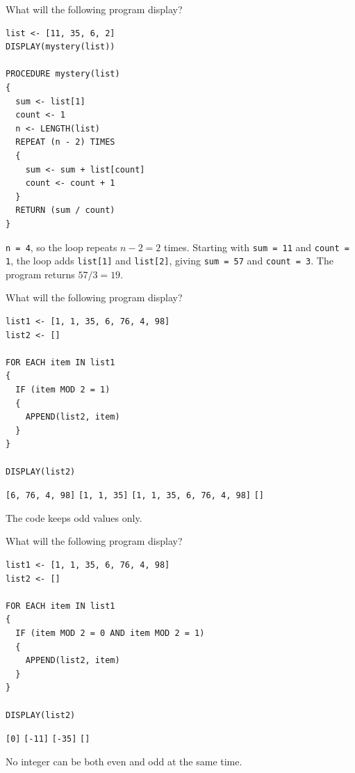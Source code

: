 \question[5]
What will the following program display?
\begin{lstlisting}[style=pseudo]
list <- [11, 35, 6, 2]
DISPLAY(mystery(list))

PROCEDURE mystery(list)
{
  sum <- list[1]
  count <- 1
  n <- LENGTH(list)
  REPEAT (n - 2) TIMES
  {
    sum <- sum + list[count]
    count <- count + 1
  }
  RETURN (sum / count)
}
\end{lstlisting}
\begin{choices}
\end{choices}
\begin{solution}
  \texttt{n = 4}, so the loop repeats \(n-2=2\) times. Starting with \texttt{sum = 11} and \texttt{count = 1}, the loop adds \texttt{list[1]} and \texttt{list[2]}, giving \texttt{sum = 57} and \texttt{count = 3}. The program returns \(57/3 = 19\).
\end{solution}

\newpage

\question[5]
What will the following program display?
\begin{lstlisting}[style=pseudo]
list1 <- [1, 1, 35, 6, 76, 4, 98]
list2 <- []

FOR EACH item IN list1
{
  IF (item MOD 2 = 1)
  {
    APPEND(list2, item)
  }
}

DISPLAY(list2)
\end{lstlisting}
\begin{choices}
  \choice \texttt{[6, 76, 4, 98]}
  \CorrectChoice \texttt{[1, 1, 35]}
  \choice \texttt{[1, 1, 35, 6, 76, 4, 98]}
  \choice \texttt{[]}
\end{choices}
\begin{solution}
  The code keeps odd values only.
\end{solution}

\question[5]
What will the following program display?
\begin{lstlisting}[style=pseudo]
list1 <- [1, 1, 35, 6, 76, 4, 98]
list2 <- []

FOR EACH item IN list1
{
  IF (item MOD 2 = 0 AND item MOD 2 = 1)
  {
    APPEND(list2, item)
  }
}

DISPLAY(list2)
\end{lstlisting}
\begin{choices}
  \choice \texttt{[0]}
  \choice \texttt{[-11]}
  \choice \texttt{[-35]}
  \CorrectChoice \texttt{[]}
\end{choices}
\begin{solution}
  No integer can be both even and odd at the same time.
\end{solution}

